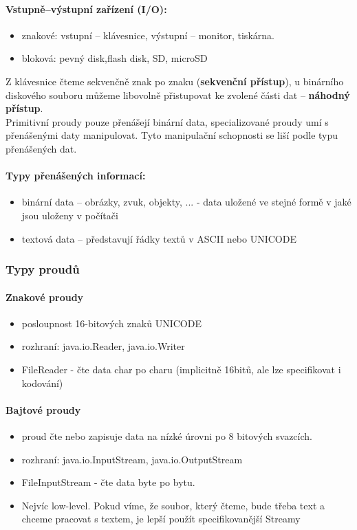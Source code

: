 \documentclass[10pt,a4paper]{article}
\begin{document}
\paragraph{Vstupně–výstupní zařízení (I/O):}

\begin{itemize}
\item znakové: vstupní – klávesnice, výstupní – monitor, tiskárna.
\item bloková: pevný disk,flash disk, SD, microSD
\end{itemize}

Z klávesnice čteme sekvenčně znak po znaku (\textbf{sekvenční přístup}), u binárního diskového souboru můžeme libovolně přistupovat ke zvolené části dat – \textbf{náhodný přístup}.\\

Primitivní proudy pouze přenášejí binární data, specializované proudy umí s přenášenými daty manipulovat. Tyto manipulační schopnosti se liší podle typu přenášených dat.

\paragraph{Typy přenášených informací:}


\begin{itemize}
\item binární data – obrázky, zvuk, objekty, ... - data uložené ve stejné formě v jaké jsou uloženy v počítači
\item textová data – představují řádky textů v ASCII nebo UNICODE
\end{itemize}
\subsubsection{Typy proudů}

\paragraph{Znakové proudy}
\begin{itemize}
\item posloupnost 16-bitových znaků UNICODE
\item rozhraní: java.io.Reader, java.io.Writer
\item FileReader - čte data char po charu (implicitně 16bitů, ale lze specifikovat i kodování)
\end{itemize}

\paragraph{Bajtové proudy}
\begin{itemize}
\item proud čte nebo zapisuje data na nízké úrovni po 8 bitových svazcích.
\item rozhraní:  java.io.InputStream, java.io.OutputStream
\item FileInputStream - čte data byte po bytu.
\item Nejvíc low-level. Pokud víme, že soubor, který čteme, bude třeba text a chceme pracovat s textem, je lepší použít specifikovanější Streamy
\end{itemize}
\end{document}
